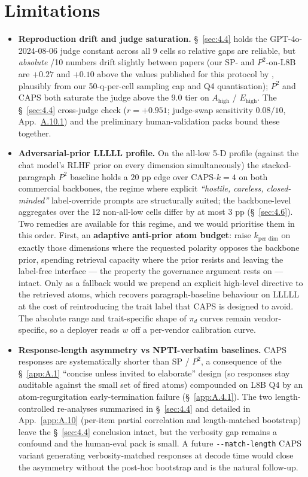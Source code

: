 \label{sec:limitations}
\section*{Limitations}

\begin{itemize}
\item \textbf{Reproduction drift and judge saturation.} \S~\ref{sec:4.4} holds the GPT-4o-2024-08-06 judge constant across all 9 cells so relative gaps are reliable, but \textit{absolute} /10 numbers drift slightly between papers (our SP- and $P^{\!2}$-on-L8B are $+0.27$ and $+0.10$ above the values published for this protocol by \citet{NPTI}, plausibly from our 50-q-per-cell sampling cap and Q4 quantisation); $P^{\!2}$ and CAPS both saturate the judge above the 9.0 tier on $A_\text{high}$ / $E_\text{high}$. The \S~\ref{sec:4.4} cross-judge check ($r = +0.951$; judge-swap sensitivity $0.08/10$, App.~\hyperref[app:A.10.1]{A.10.1}) and the preliminary human-validation packs bound these together.
\item \textbf{Adversarial-prior LLLLL profile.} On the all-low 5-D profile (against the chat model's RLHF prior on every dimension simultaneously) the stacked-paragraph $P^{\!2}$ baseline holds a $20$ pp edge over CAPS-$k{=}4$ on both commercial backbones, the regime where explicit \textit{``hostile, careless, closed-minded''} label-override prompts are structurally suited; the backbone-level aggregates over the 12 non-all-low cells differ by at most 3 pp (\S~\ref{sec:4.6}). Two remedies are available for this regime, and we would prioritise them in this order. First, an \textbf{adaptive anti-prior atom budget}: raise $k_\text{per dim}$ on exactly those dimensions where the requested polarity opposes the backbone prior, spending retrieval capacity where the prior resists and leaving the label-free interface --- the property the governance argument rests on --- intact. Only as a fallback would we prepend an explicit high-level directive to the retrieved atoms, which recovers paragraph-baseline behaviour on LLLLL at the cost of reintroducing the trait label that CAPS is designed to avoid. The absolute range and trait-specific shape of $\pi_d$ curves remain vendor-specific, so a deployer reads $w$ off a per-vendor calibration curve.
\item \textbf{Response-length asymmetry vs NPTI-verbatim baselines.} CAPS responses are systematically shorter than SP / $P^{\!2}$, a consequence of the \S~\ref{app:A.1} ``concise unless invited to elaborate'' design (so responses stay auditable against the small set of fired atoms) compounded on L8B Q4 by an atom-regurgitation early-termination failure (\S~\ref{app:A.4.1}). The two length-controlled re-analyses summarised in \S~\ref{sec:4.4} and detailed in App.~\ref{app:A.10} (per-item partial correlation and length-matched bootstrap) leave the \S~\ref{sec:4.4} conclusion intact, but the verbosity gap remains a confound and the human-eval pack is small. A future \texttt{-\allowbreak{}-\allowbreak{}match-\allowbreak{}length} CAPS variant generating verbosity-matched responses at decode time would close the asymmetry without the post-hoc bootstrap and is the natural follow-up.

\end{itemize}
